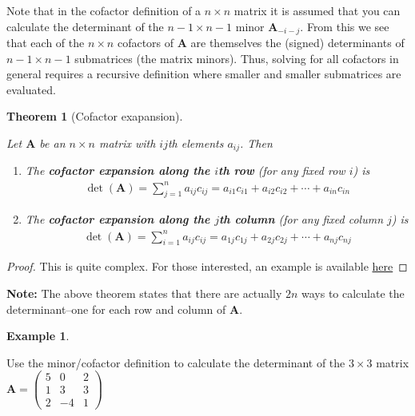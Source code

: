 \documentclass[
]{book}
\newtheorem{theorem}{Theorem}[chapter]
\theoremstyle{definition}
\theoremstyle{definition}
\newtheorem{example}{Example}[chapter]
\theoremstyle{definition}
\theoremstyle{remark}
\begin{document}
Note that in the cofactor definition of a \(n \times n\) matrix it is assumed that you can calculate the determinant of the \(n-1 \times n-1\) minor \(\mathbf{A}_{-i-j}\). From this we see that each of the \(n \times n\) cofactors of \(\mathbf{A}\) are themselves the (signed) determinants of \(n-1 \times n-1\) submatrices (the matrix minors). Thus, solving for all cofactors in general requires a recursive definition where smaller and smaller submatrices are evaluated.

\begin{theorem}[Cofactor exapansion]
\protect\hypertarget{thm:cofactor-expansion}{}\label{thm:cofactor-expansion}

Let \(\mathbf{A}\) be an \(n \times n\) matrix with \(ij\)th elements \(a_{ij}\). Then

\begin{enumerate}
\def\labelenumi{\alph{enumi})}
\item
  The \textbf{cofactor expansion along the \(i\)th row} (for any fixed row \(i\)) is
  \[
  \begin{aligned}
  \det(\mathbf{A}) = \sum_{j=1}^n a_{ij} c_{ij} = a_{i1} c_{i1} + a_{i2} c_{i2} + \cdots + a_{in} c_{in}
  \end{aligned}
  \]
\item
  The \textbf{cofactor expansion along the \(j\)th column} (for any fixed column \(j\)) is
  \[
  \begin{aligned}
  \det(\mathbf{A}) = \sum_{i=1}^n a_{ij} c_{ij} = a_{1j} c_{1j} + a_{2j} c_{2j} + \cdots + a_{nj} c_{nj}
  \end{aligned}
  \]
\end{enumerate}

\end{theorem}

\begin{proof}

This is quite complex. For those interested, an example is available \href{https://textbooks.math.gatech.edu/ila/determinants-cofactors.html}{here}

\end{proof}

\textbf{Note:}
The above theorem states that there are actually \(2n\) ways to calculate the determinant--one for each row and column of \(\mathbf{A}\).

\begin{example}
\protect\hypertarget{exm:unlabeled-div-103}{}\label{exm:unlabeled-div-103}

Use the minor/cofactor definition to calculate the determinant of the \(3 \times 3\) matrix \(\mathbf{A} = \begin{pmatrix} 5 & 0 & 2 \\ 1 & 3 & 3 \\ 2 & -4 & 1 \end{pmatrix}\)

\end{example}
\end{document}
